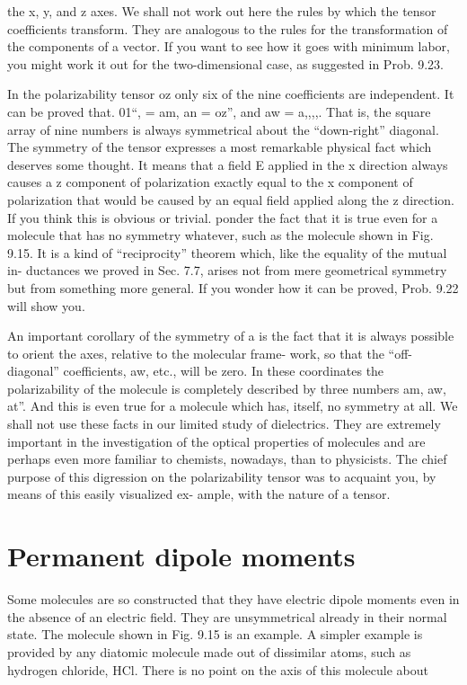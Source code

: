 {%
 

 

 

the x, y, and z axes. We shall not work out here the rules by which
the tensor coefficients transform. They are analogous to the rules
for the transformation of the components of a vector. If you want
to see how it goes with minimum labor, you might work it out for the
two-dimensional case, as suggested in Prob. 9.23.

In the polarizability tensor oz only six of the nine coefficients are
independent. It can be proved that. 01``, = am, an = oz'', and
aw = a,,,,. That is, the square array of nine numbers is always symmetrical
about the ``down-right'' diagonal. The symmetry of the
tensor expresses a most remarkable physical fact which deserves
some thought. It means that a field E applied in the x direction
always causes a z component of polarization exactly equal to the
x component of polarization that would be caused by an equal field
applied along the z direction. If you think this is obvious or trivial.
ponder the fact that it is true even for a molecule that has no symmetry
whatever, such as the molecule shown in Fig. 9.15. It is a kind
of ``reciprocity'' theorem which, like the equality of the mutual in-
ductances we proved in Sec. 7.7, arises not from mere geometrical
symmetry but from something more general. If you wonder how it
can be proved, Prob. 9.22 will show you.

An important corollary of the symmetry of a is the fact that it is
always possible to orient the axes, relative to the molecular frame-
work, so that the ``off-diagonal'' coefficients, aw, etc., will be zero.
In these coordinates the polarizability of the molecule is completely
described by three numbers am, aw, at''. And this is even true for
a molecule which has, itself, no symmetry at all. We shall not use
these facts in our limited study of dielectrics. They are extremely
important in the investigation of the optical properties of molecules
and are perhaps even more familiar to chemists, nowadays, than to
physicists. The chief purpose of this digression on the polarizability
tensor was to acquaint you, by means of this easily visualized ex-
ample, with the nature of a tensor.

\section{Permanent dipole moments}

Some molecules are so constructed that they have electric dipole
moments even in the absence of an electric field. They are unsymmetrical
already in their normal state. The molecule shown in
Fig. 9.15 is an example. A simpler example is provided by any
diatomic molecule made out of dissimilar atoms, such as hydrogen
chloride, HCl. There is no point on the axis of this molecule about

}
